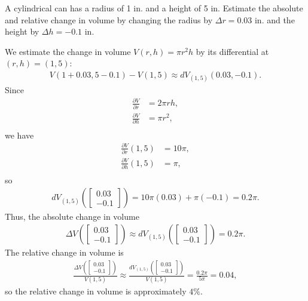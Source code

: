 \documentclass[12pt,letterpaper,reqno]{article}
\numberwithin{equation}{section}
\begin{document}
{{}

\begin{exercise}
A cylindrical can has a radius of 1 in. and a height of 5 in. Estimate the absolute and relative change in volume by changing the radius by $\Delta r=0.03$ in. and the height by $\Delta h=-0.1$ in.	
\end{exercise}

{\color{red}
\begin{solution}
We estimate the change in volume $V(r,h)=\pi r^2h$ by its differential at $(r,h)=(1,5)$:
\begin{align*}
	V(1+0.03,5-0.1)-V(1,5) \approx dV_{(1,5)}(0.03,-0.1).
\end{align*}
Since
\begin{align*}
	\frac{\partial V}{\partial r}&=2\pi rh, \\
	\frac{\partial V}{\partial h}&=\pi r^2, \\
\end{align*}
we have
\begin{align*}
	\frac{\partial V}{\partial r}(1,5)&=10\pi, \\
	\frac{\partial V}{\partial h}(1,5)&=\pi, \\
\end{align*}	
so
\begin{align*}
	dV_{(1,5)}(\begin{bmatrix}
		0.03 \\ -0.1
	\end{bmatrix})=10\pi(0.03)+\pi(-0.1)=0.2\pi.
\end{align*}
Thus, the absolute change in volume 
\begin{align*}
	\Delta V(\begin{bmatrix}
		0.03 \\ -0.1
	\end{bmatrix}) \approx dV_{(1,5)}(\begin{bmatrix}
		0.03 \\ -0.1
	\end{bmatrix})=0.2\pi.
\end{align*}
The relative change in volume is
\begin{align*}
	\frac{\Delta V(\begin{bmatrix}
		0.03 \\ -0.1
	\end{bmatrix})}{V(1,5)} \approx \frac{dV_{(1,5)}(\begin{bmatrix}
		0.03 \\ -0.1
	\end{bmatrix})}{V(1,5)}=\frac{0.2\pi}{5\pi}=0.04,
\end{align*}
so the relative change in volume is approximately $4\%$.
\end{solution}
}

}
\end{document}
